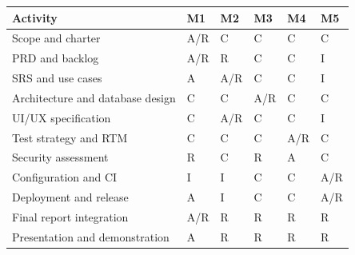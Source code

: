 \documentclass[
  10pt,
  a4paper,
  oneside]{report}
\newcounter{none} %
\begin{document}
{\def\LTcaptype{none} %
\begin{longtable}[]{@{}
  >{\raggedright\arraybackslash}p{}
  >{\raggedleft\arraybackslash}p{}
  >{\raggedleft\arraybackslash}p{}
  >{\raggedleft\arraybackslash}p{}
  >{\raggedleft\arraybackslash}p{}
  >{\raggedleft\arraybackslash}p{}@{}}
\toprule\noalign{}
\begin{minipage}[b]{\linewidth}\raggedright
Activity
\end{minipage} & \begin{minipage}[b]{\linewidth}\raggedleft
M1
\end{minipage} & \begin{minipage}[b]{\linewidth}\raggedleft
M2
\end{minipage} & \begin{minipage}[b]{\linewidth}\raggedleft
M3
\end{minipage} & \begin{minipage}[b]{\linewidth}\raggedleft
M4
\end{minipage} & \begin{minipage}[b]{\linewidth}\raggedleft
M5
\end{minipage} \\
\midrule\noalign{}
\endhead
\bottomrule\noalign{}
\endlastfoot
Scope and charter & A/R & C & C & C & C \\
PRD and backlog & A/R & R & C & C & I \\
SRS and use cases & A & A/R & C & C & I \\
Architecture and database design & C & C & A/R & C & C \\
UI/UX specification & C & A/R & C & C & I \\
Test strategy and RTM & C & C & C & A/R & C \\
Security assessment & R & C & R & A & C \\
Configuration and CI & I & I & C & C & A/R \\
Deployment and release & A & I & C & C & A/R \\
Final report integration & A/R & R & R & R & R \\
Presentation and demonstration & A & R & R & R & R \\
\end{longtable}
}
\end{document}

